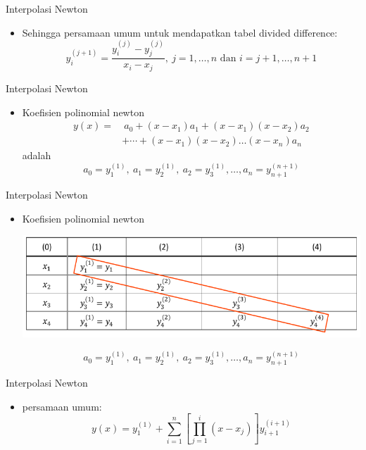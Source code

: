\documentclass[pdflatex,compress,mathserif]{beamer}
\begin{document}
\begin{frame}{Interpolasi Newton}
	\begin{itemize}
		\item Sehingga persamaan umum untuk mendapatkan tabel divided difference:
		$$ y_i^{(j+1)} = \frac{y_i^{(j)} - y_j^{(j)}}{x_i - x_j},~j=1,\dots,n \text{ dan } i=j+1,\dots,n+1$$
	\end{itemize}
\end{frame}

\begin{frame}{Interpolasi Newton}
	\begin{itemize}
		\item Koefisien polinomial newton
		\begin{align*}
			y(x) =&~ a_0 + (x - x_1)a_1 + (x - x_1)(x - x_2)a_2 \\
			&+ \cdots + (x - x_1)(x - x_2) \dots (x - x_n)a_n
		\end{align*}
		adalah
		$$a_0 = y_1^{(1)},~a_1 = y_2^{(1)},~a_2 = y_3^{(1)},\dots,a_n = y_{n+1}^{(n+1)}$$
	\end{itemize}
\end{frame}

\begin{frame}{Interpolasi Newton}
	\begin{itemize}
		\item Koefisien polinomial newton
		\begin{center}
			\includegraphics[width=\linewidth]{img/img04d}
		\end{center}
		$$a_0 = y_1^{(1)},~a_1 = y_2^{(1)},~a_2 = y_3^{(1)},\dots,a_n = y_{n+1}^{(n+1)}$$
	\end{itemize}
\end{frame}

\begin{frame}{Interpolasi Newton}
	\begin{itemize}
		\item persamaan umum:
		$$ y(x) = y_1^{(1)} + \sum_{i=1}^{n} \left[ \prod_{j=1}^{i}(x - x_j) \right] y_{i+1}^{(i+1)} $$
	\end{itemize}
\end{frame}
\end{document}
